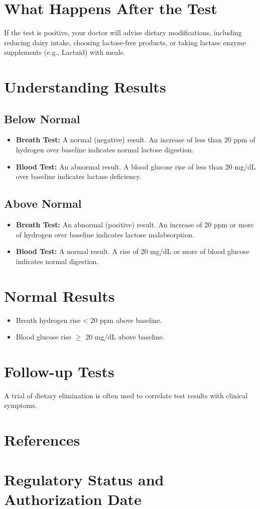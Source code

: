 \section*{What Happens After the Test}
If the test is positive, your doctor will advise dietary modifications, including reducing dairy intake, choosing lactose-free products, or taking lactase enzyme supplements (e.g., Lactaid) with meals.

\section*{Understanding Results}

\subsection*{Below Normal}
\begin{itemize}
  \item \textbf{Breath Test:} A normal (negative) result. An increase of less than 20 ppm of hydrogen over baseline indicates normal lactose digestion.
  \item \textbf{Blood Test:} An abnormal result. A blood glucose rise of less than 20 mg/dL over baseline indicates lactase deficiency.
\end{itemize}

\subsection*{Above Normal}
\begin{itemize}
  \item \textbf{Breath Test:} An abnormal (positive) result. An increase of 20 ppm or more of hydrogen over baseline indicates lactose malabsorption.
  \item \textbf{Blood Test:} A normal result. A rise of 20 mg/dL or more of blood glucose indicates normal digestion.
\end{itemize}

\section*{Normal Results}
\begin{itemize}
  \item Breath hydrogen rise < 20 ppm above baseline.
  \item Blood glucose rise $\geq$ 20 mg/dL above baseline.
\end{itemize}

\section*{Follow-up Tests}
A trial of dietary elimination is often used to correlate test results with clinical symptoms.

\section*{References}



\clearpage
\section*{Regulatory Status and Authorization Date}

\clearpage
